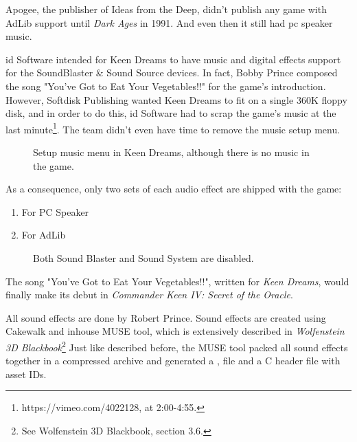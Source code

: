 \documentclass[book.tex]{subfiles}
\begin{document}
\par
{} Apogee, the publisher of Ideas from the Deep, didn't publish any game with AdLib support until \textit{Dark Ages} in 1991. And even then it still had pc speaker music.\\

\par
id Software intended for Keen Dreams to have music and digital effects support for the SoundBlaster \& Sound Source devices. In fact, Bobby Prince composed the song "You've Got to Eat Your Vegetables!!" for the game's introduction. However, Softdisk Publishing wanted Keen Dreams to fit on a single 360K floppy disk, and in order to do this, id Software had to scrap the game's music at the last minute\footnote{https://vimeo.com/4022128, at 2:00-4:55.}. The team didn't even have time to remove the music setup menu.\\

\par
\par
\begin{figure}[H]
\centering
{}
\caption{Setup music menu in Keen Dreams, although there is no music in the game.}
\end{figure}
\par

\pagebreak

As a consequence, only two sets of each audio effect are shipped with the game:
\begin{enumerate}
\item For PC Speaker
\item For AdLib
\end{enumerate}

\begin{figure}[H]
\centering
{}
\caption{Both Sound Blaster and Sound System are disabled.}
\end{figure}
\par

 The song "You've Got to Eat Your Vegetables!!", written for \textit{Keen Dreams}, would finally make its debut in \textit{Commander Keen IV: Secret of the Oracle}.\\


\par
All sound effects are done by Robert Prince. Sound effects are created using Cakewalk and inhouse MUSE tool, which is  extensively described in \textit{Wolfenstein 3D Blackbook}\footnote{See Wolfenstein 3D Blackbook, section 3.6.}
Just like described before, the MUSE tool packed all sound effects together in a compressed  archive and generated a ,  file and a C header file with asset IDs.\\
\end{document}
